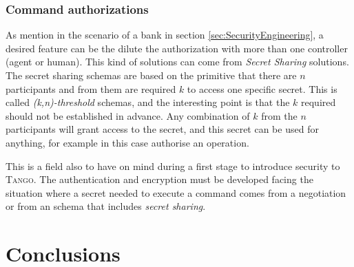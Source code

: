 \documentclass[10pt,a4paper,twoside]{llncs}
\newcommand{\todo}[1]{\texttt{\color{red}TODO:} ``\emph{#1}''}
\newcommand{\tango}{\textsc{Tango}}
\newcommand{\omniorb}{\textsc{omniORB}}
\begin{document}
\subsubsection{Command authorizations}\label{sec:secretSharing}

As mention in the scenario of a bank in section \ref{sec:SecurityEngineering}, a desired feature can be the dilute the authorization with more than one controller (agent or human). This kind of solutions can come from \emph{Secret Sharing} solutions. The secret sharing schemas are based on the primitive that there are $n$ participants and from them are required $k$ to access one specific secret. This is called \emph{(k,n)-threshold} schemas, and the interesting point is that the $k$ required should not be established in advance. Any combination of $k$ from the $n$ participants will grant access to the secret, and this secret can be used for anything, for example in this case authorise an operation.

This is a field also to have on mind during a first stage to introduce security to \tango. The authentication and encryption must be developed facing the situation where a secret needed to execute a command comes from a negotiation or from an schema that includes \emph{secret sharing}.


    
\section{Conclusions}\label{sec:conclusions}

\end{document}
